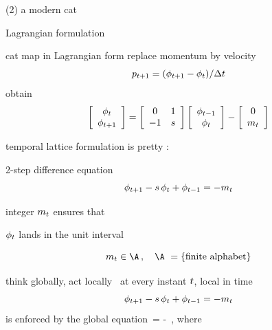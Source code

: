 \begin{frame}{(2) a modern cat}
\vfill
\begin{center}
{\huge Lagrangian formulation}
\end{center}
\vfill
\end{frame} %

\begin{frame}{cat map in Lagrangian form}
replace momentum by velocity
\[
p_{t+1}=(\phi_{t+1}  - \phi_{t})/\Delta t
\]
obtain
 \[
 \left[\begin{array}{c}
   \phi_{t}  \\
   \phi_{t+1}
  \end{array} \right]=
  \left[
\begin{array}{cc}
0 & 1 \\
-1 & s \\
\end{array}
    \right]
    \left[\begin{array}{c}
   \phi_{t-1}  \\
   \phi_{t}
  \end{array} \right]
 - \left[\begin{array}{c}
 0  \\
 {m_{t}}
 \end{array} \right]
 \] %

temporal lattice formulation %
is {\Large pretty} :
\begin{block}{2-step difference equation}
\[
\phi_{t+1}  -  s \, \phi_{t} + \phi_{t-1}
    =
-{m_{t}}
\] %
\end{block}
integer ${m_{t}}$ ensures that

\hfill $\phi_{t}$ lands in the unit interval

\bigskip
\[
\Ssym{t}\in  \A
\,,\quad \A\ = \{\mbox{finite alphabet}\}
\]
\end{frame} %

\begin{frame}{think globally, act locally}
\templatt\ at every instant $t$, {\color{blue}local} in time
\[
\phi_{t+1}  -  s \, \phi_{t} + \phi_{t-1}
    =
-{m_{t}}
\] %
is enforced by the {\color{blue}global} equation
\beq
 \jMorb\,\Xx = -\Mm
\,,
where
\end{frame} %

